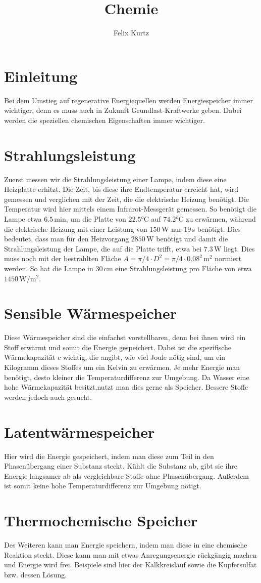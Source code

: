 \documentclass[12pt,a4paper,headinclude,bibtotoc]{scrartcl}
\begin{document}
\title{Chemie}
\author{Felix Kurtz}
\maketitle

\section{Einleitung}
Bei dem Umstieg auf regenerative Energiequellen werden Energiespeicher immer wichtiger, denn es muss auch in Zukunft Grundlast-Kraftwerke geben.
Dabei werden die speziellen chemischen Eigenschaften immer wichtiger.

\section{Strahlungsleistung}
Zuerst messen wir die Strahlungsleistung einer Lampe, indem diese eine Heizplatte erhitzt.
Die Zeit, bis diese ihre Endtemperatur erreicht hat, wird gemessen und verglichen mit der Zeit, die die elektrische Heizung benötigt.
Die Temperatur wird hier mittels einem Infrarot-Messgerät gemessen.
So benötigt die Lampe etwa $6.5\,$min, um die Platte von $22.5\si\celsius$ auf $74.2\si\celsius$ zu erwärmen, während die elektrische Heizung mit einer Leistung von $150\,$W nur $19\,$s benötigt.
Dies bedeutet, dass man für den Heizvorgang $2850\,$W benötigt und damit die Strahlungsleistung der Lampe, die auf die Platte trifft, etwa bei $7.3\,$W liegt.
Dies muss noch mit der bestrahlten Fläche $A=\pi/4 \cdot D^2=\pi/4 \cdot 0.08^2\,\si\meter^2$ normiert werden.
So hat die Lampe in $30\,$cm eine Strahlungsleistung pro Fläche von etwa $1450\,\si{\watt\per\meter^2}$.

\section{Sensible Wärmespeicher}
Diese Wärmespeicher sind die einfachst vorstellbaren, denn bei ihnen wird ein Stoff erwärmt und somit die Energie gespeichert.
Dabei ist die spezifische Wärmekapazität $c$ wichtig, die angibt, wie viel Joule nötig sind, um ein Kilogramm dieses Stoffes um ein Kelvin zu erwärmen.
Je mehr Energie man benötigt, desto kleiner die Temperaturdifferenz zur Umgebung.
Da Wasser eine hohe Wärmekapazität besitzt,nutzt man dies gerne als Speicher.
Bessere Stoffe werden jedoch auch gesucht.

\section{Latentwärmespeicher}
Hier wird die Energie gespeichert, indem man diese zum Teil in den Phasenübergang einer Substanz steckt.
Kühlt die Substanz ab, gibt sie ihre Energie langsamer ab als vergleichbare Stoffe ohne Phasenübergang.
Außerdem ist somit keine hohe Temperaturdifferenz zur Umgebung nötigt.

\section{Thermochemische Speicher}
Des Weiteren kann man Energie speichern, indem man diese in eine chemische Reaktion steckt.
Diese kann man mit etwas Anregungsenergie rückgängig machen und Energie wird frei.
Beispiele sind hier der Kalkkreislauf sowie die Kupfersulfat bzw. dessen Lösung.
\end{document}

